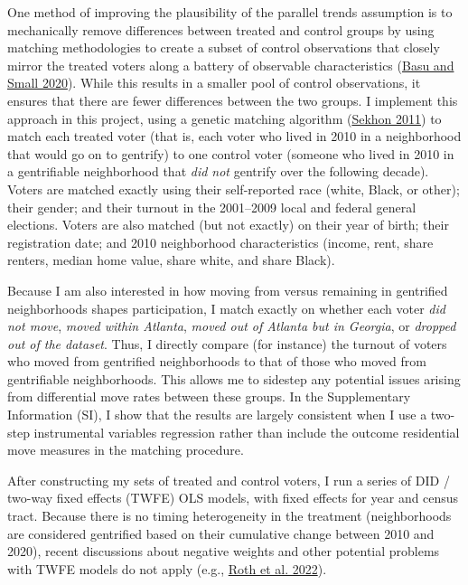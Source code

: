 \documentclass[
  12pt,
]{article}
\begin{document}
One method of improving the plausibility of the parallel trends assumption is to mechanically remove differences between treated and control groups by using matching methodologies to create a subset of control observations that closely mirror the treated voters along a battery of observable characteristics (\protect\hyperlink{ref-Basu2020}{Basu and Small 2020}). While this results in a smaller pool of control observations, it ensures that there are fewer differences between the two groups. I implement this approach in this project, using a genetic matching algorithm (\protect\hyperlink{ref-Sekhon2011}{Sekhon 2011}) to match each treated voter (that is, each voter who lived in 2010 in a neighborhood that would go on to gentrify) to one control voter (someone who lived in 2010 in a gentrifiable neighborhood that \emph{did not} gentrify over the following decade). Voters are matched exactly using their self-reported race (white, Black, or other); their gender; and their turnout in the 2001--2009 local and federal general elections. Voters are also matched (but not exactly) on their year of birth; their registration date; and 2010 neighborhood characteristics (income, rent, share renters, median home value, share white, and share Black).

Because I am also interested in how moving from versus remaining in gentrified neighborhoods shapes participation, I match exactly on whether each voter \emph{did not move}, \emph{moved within Atlanta}, \emph{moved out of Atlanta but in Georgia}, or \emph{dropped out of the dataset}. Thus, I directly compare (for instance) the turnout of voters who moved from gentrified neighborhoods to that of those who moved from gentrifiable neighborhoods. This allows me to sidestep any potential issues arising from differential move rates between these groups. In the Supplementary Information (SI), I show that the results are largely consistent when I use a two-step instrumental variables regression rather than include the outcome residential move measures in the matching procedure.

After constructing my sets of treated and control voters, I run a series of DID / two-way fixed effects (TWFE) OLS models, with fixed effects for year and census tract. Because there is no timing heterogeneity in the treatment (neighborhoods are considered gentrified based on their cumulative change between 2010 and 2020), recent discussions about negative weights and other potential problems with TWFE models do not apply (e.g., \protect\hyperlink{ref-Roth2022}{Roth et al. 2022}).
\end{document}
